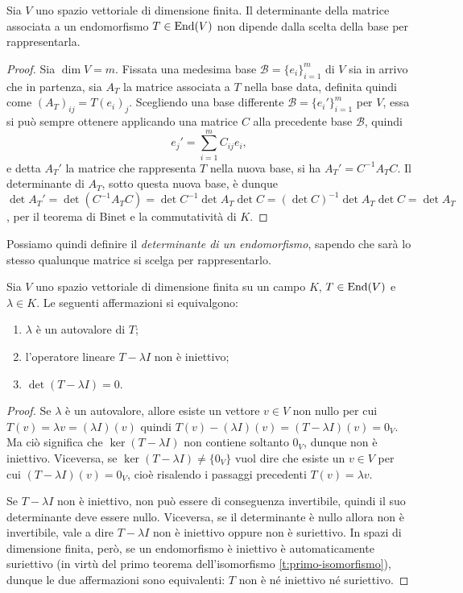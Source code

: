 \begin{teorema} \label{t:determinante-invarianza-base}
	Sia $V$ uno spazio vettoriale di dimensione finita.
	Il determinante della matrice associata a un endomorfismo $T\in\operatorname{End}(V)$ non dipende dalla scelta della base per rappresentarla.	
\end{teorema}
\begin{proof}
	Sia $\dim V=m$.
	Fissata una medesima base $\mathcal B=\{e_i\}_{i=1}^m$ di $V$ sia in arrivo che in partenza, sia $A_T$ la matrice associata a $T$ nella base data, definita quindi come $(A_T)_{ij}=T(e_i)_j$.
	Scegliendo una base differente $\mathcal B=\{e_i'\}_{i=1}^m$ per $V$, essa si può sempre ottenere applicando una matrice $C$ alla precedente base $\mathcal B$, quindi
	\begin{equation*}
		e_j'=\sum_{i=1}^mC_{ij}e_i,
	\end{equation*}
	e detta $A_T'$ la matrice che rappresenta $T$ nella nuova base, si ha $A_T'=C^{-1}A_TC$.
	Il determinante di $A_T$, sotto questa nuova base, è dunque $\det A_T'=\det(C^{-1}A_TC)=\det C^{-1}\det A_T\det C=(\det C)^{-1}\det A_T\det C=\det A_T$, per il teorema di Binet e la commutatività di $K$.
\end{proof}
Possiamo quindi definire il \emph{determinante di un endomorfismo}, sapendo che sarà lo stesso qualunque matrice si scelga per rappresentarlo. 

\begin{teorema}\label{t:autovalore-determinante}
	Sia $V$ uno spazio vettoriale di dimensione finita su un campo $K$, $T\in\operatorname{End}(V)$ e $\lambda\in K$. Le seguenti affermazioni si equivalgono:
	\begin{enumerate}
		\item $\lambda$ è un autovalore di $T$;
		\item l'operatore lineare $T-\lambda I$ non è iniettivo;
		\item $\det(T-\lambda I)=0$.
	\end{enumerate}
\end{teorema}
\begin{proof}
	Se $\lambda$ è un autovalore, allore esiste un vettore $v\in V$ non nullo per cui $T(v)=\lambda v=(\lambda I)(v)$ quindi $T(v)-(\lambda I)(v)=(T-\lambda I)(v)=0_V$.
	Ma ciò significa che $\ker(T-\lambda I)$ non contiene soltanto $0_V$, dunque non è iniettivo.
	Viceversa, se $\ker(T-\lambda I)\neq\{0_V\}$ vuol dire che esiste un $v\in V$ per cui $(T-\lambda I)(v)=0_V$, cioè risalendo i passaggi precedenti $T(v)=\lambda v$.

	Se $T-\lambda I$ non è iniettivo, non può essere di conseguenza invertibile, quindi il suo determinante deve essere nullo.
	Viceversa, se il determinante è nullo allora non è invertibile, vale a dire $T-\lambda I$ non è iniettivo oppure non è suriettivo.
	In spazi di dimensione finita, però, se un endomorfismo è iniettivo è automaticamente suriettivo (in virtù del primo teorema dell'isomorfismo \ref{t:primo-isomorfismo}), dunque le due affermazioni sono equivalenti: $T$ non è n\'e iniettivo n\'e suriettivo.
\end{proof}

